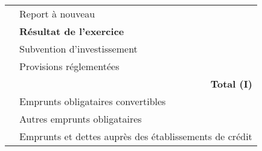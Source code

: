 \begin{table}[h]
\begin{tabular}{|l|p{6.5cm}|}
\cline{2-2}                                                                                                                                                           
                                                                                              &  Report à nouveau	                                    \\ 
\cline{2-2}                                                                                                                                                           
                                                                                              &  \textbf{Résultat de l'exercice}                        \\ 
\cline{2-2}                                                                                                                                                           
                                                                                              &  Subvention d'investissement	                        \\ 
\cline{2-2}                                                                                                                                                           
                                                                                              &  Provisions réglementées                                \\ 
\cline{2-2}                                                                                     
                                                                                              &  \multicolumn{1}{r|}{\textbf{Total (I)}}                \\ 
\hline
\parbox[t]{2mm}{} & Emprunts obligataires convertibles	                        \\ 
                                                                                              & Autres emprunts obligataires	                        \\ 
                                                                                              & Emprunts et dettes auprès des établissements de crédit  \\ 

\end{tabular}
\end{table}
